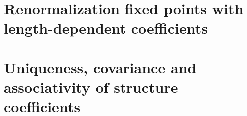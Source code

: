 \section{Renormalization fixed points with length-dependent coefficients}

%
%
%

\section{Uniqueness, covariance and associativity of structure coefficients}

%
